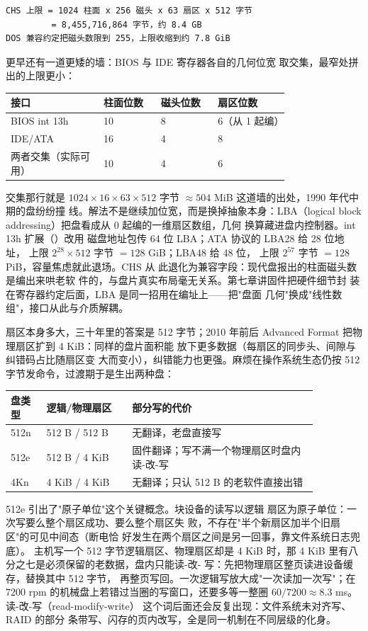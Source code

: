 \begin{lstlisting}
CHS 上限 = 1024 柱面 x 256 磁头 x 63 扇区 x 512 字节
         = 8,455,716,864 字节，约 8.4 GB
DOS 兼容约定把磁头数限到 255，上限收缩到约 7.8 GiB
\end{lstlisting}

更早还有一道更矮的墙：BIOS 与 IDE 寄存器各自的几何位宽
取交集，最窄处拼出的上限更小：

\begin{longtable}{L{0.26\linewidth}L{0.16\linewidth}L{0.16\linewidth}L{0.2\linewidth}}
\toprule
接口 & 柱面位数 & 磁头位数 & 扇区位数 \\
\midrule
BIOS int 13h & 10 & 8 & 6（从 1 起编） \\
IDE/ATA & 16 & 4 & 8 \\
两者交集（实际可用） & 10 & 4 & 6 \\
\bottomrule
\end{longtable}

交集那行就是 $1024\times16\times63\times512$ 字节
$\approx504$ MiB 这道墙的出处，1990 年代中期的盘纷纷撞
线。解法不是继续加位宽，而是换掉抽象本身：LBA（logical
block addressing）把盘看成从 0 起编的一维扇区数组，几何
换算藏进盘内控制器。int 13h 扩展（）改用
磁盘地址包传 64 位 LBA；ATA 协议的 LBA28 给 28 位地址，
上限 $2^{28}\times512$ 字节 $=128$ GiB；LBA48 给 48 位，
上限 $2^{57}$ 字节 $=128$ PiB，容量焦虑就此退场。CHS 从
此退化为兼容字段：现代盘报出的柱面磁头数是编出来哄老软
件的，与盘片真实布局毫无关系。第七章讲固件把硬件细节封
装在寄存器约定后面，LBA 是同一招用在编址上——把"盘面
几何"换成"线性数组"，接口从此与介质解耦。

扇区本身多大，三十年里的答案是 512 字节；2010 年前后
Advanced Format 把物理扇区扩到 4 KiB：同样的盘片面积能
放下更多数据（每扇区的同步头、间隙与纠错码占比随扇区变
大而变小），纠错能力也更强。麻烦在操作系统生态仍按 512
字节发命令，过渡期于是生出两种盘：

\begin{longtable}{L{0.1\linewidth}L{0.24\linewidth}L{0.52\linewidth}}
\toprule
盘类型 & 逻辑/物理扇区 & 部分写的代价 \\
\midrule
512n & 512 B / 512 B & 无翻译，老盘直接写 \\
512e & 512 B / 4 KiB & 固件翻译；写不满一个物理扇区时盘内读-改-写 \\
4Kn & 4 KiB / 4 KiB & 无翻译；只认 512 B 的老软件直接出错 \\
\bottomrule
\end{longtable}

512e 引出了"原子单位"这个关键概念。块设备的读写以逻辑
扇区为原子单位：一次写要么整个扇区成功、要么整个扇区失
败，不存在"半个新扇区加半个旧扇区"的可见中间态（断电恰
好发生在两个扇区之间是另一回事，靠文件系统日志兜底）。
主机写一个 512 字节逻辑扇区、物理扇区却是 4 KiB 时，那
4 KiB 里有八分之七是必须保留的老数据，盘内只能读-改-
写：先把物理扇区整页读进设备缓存，替换其中 512 字节，
再整页写回。一次逻辑写放大成"一次读加一次写"；在
7200 rpm 的机械盘上若错过当圈的写窗口，还要多等一整圈
$60/7200\approx8.3$ ms。读-改-写（read-modify-write）
这个词后面还会反复出现：文件系统未对齐写、RAID 的部分
条带写、闪存的页内改写，全是同一机制在不同层级的化身。

